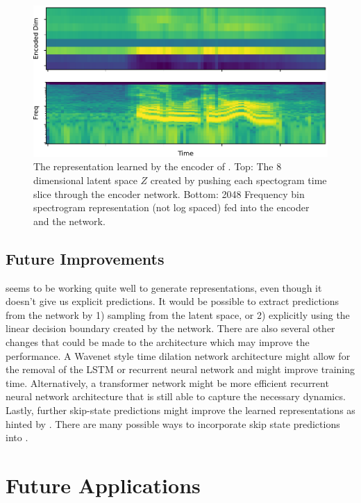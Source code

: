 \begin{figure}[tbp] 
  \centering
  \includegraphics[width=\textwidth]{figures/encoder.pdf}
  \caption[8 dimensional $Z$ space learned by Contrastive Predictive Coding.]
{The representation learned by the encoder of \CPC. Top: The 8 dimensional latent space $Z$ created by pushing each spectogram time slice through the encoder network. Bottom: 2048 Frequency bin spectrogram representation (not log spaced) fed into the encoder and the \CPC network.
}
  \label{fig:encoder}
\end{figure}

\subsection{Future Improvements}
\CPC seems to be working quite well to generate representations, even though it doesn't give us explicit predictions. It would be possible to extract predictions from the \CPC network by 1) sampling from the latent space, or 2) explicitly using the linear decision boundary created by the network. There are also several other changes that could be made to the architecture which may improve the performance. A Wavenet\cite{van2016wavenet} style time dilation network architecture might allow for the removal of the LSTM or recurrent neural network and might improve training time. Alternatively, a transformer network\cite{vaswani2017attention} might be more efficient recurrent neural network architecture that is still able to capture the necessary dynamics. Lastly, further skip-state predictions might improve the learned representations as hinted by \cite{gregor2018temporal}. There are many possible ways to incorporate skip state predictions into \CPC.

\section{Future Applications}

